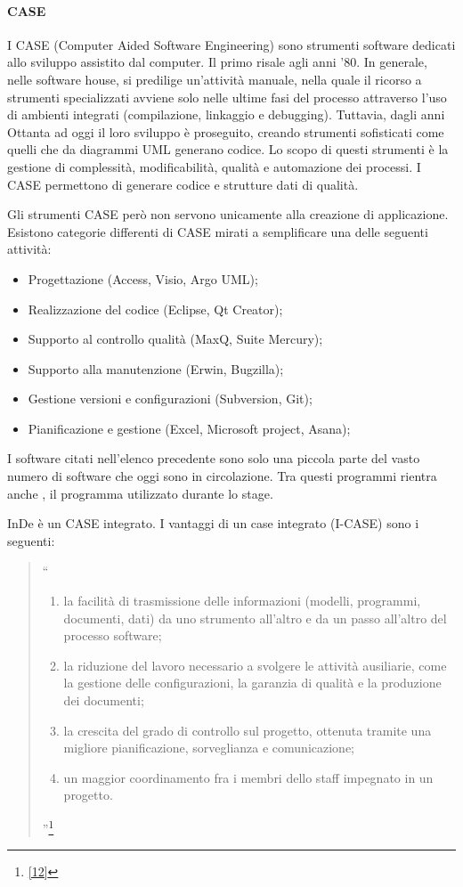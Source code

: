 \paragraph{CASE}\label{CASE}
I CASE (Computer Aided Software Engineering) sono strumenti software dedicati allo sviluppo assistito dal computer. Il primo risale agli anni '80. In generale, nelle software house, si predilige un'attività manuale, nella quale il ricorso a strumenti specializzati avviene solo nelle ultime fasi del processo attraverso l'uso di ambienti integrati (compilazione, linkaggio e debugging).
Tuttavia, dagli anni Ottanta ad oggi il loro sviluppo è proseguito, creando strumenti sofisticati come quelli che da diagrammi UML generano codice.
Lo scopo di questi strumenti è la gestione di complessità, modificabilità, qualità e automazione dei processi. I CASE permettono di generare codice e strutture dati di qualità. 

Gli strumenti CASE però non servono unicamente alla creazione di applicazione. Esistono categorie differenti di CASE mirati a semplificare una delle seguenti attività:
\begin{itemize}
	\item Progettazione (Access, Visio, Argo UML);
	\item Realizzazione del codice (Eclipse, Qt Creator);
	\item Supporto al controllo qualità (MaxQ, Suite Mercury);
	\item Supporto alla manutenzione (Erwin, Bugzilla);
	\item Gestione versioni e configurazioni (Subversion, Git);
	\item Pianificazione e gestione (Excel, Microsoft project, Asana);
\end{itemize}
I software citati nell'elenco precedente sono solo una piccola parte del vasto numero di software che oggi sono in circolazione. Tra questi programmi rientra anche \inde, il programma utilizzato durante lo stage. 

InDe è un CASE integrato. I vantaggi di un case integrato (I-CASE) sono i seguenti:

\begin{quote}
	``	
	\begin{enumerate}
		\item la facilità di trasmissione delle informazioni (modelli, programmi, documenti, dati) da uno strumento all'altro e da un passo all'altro del processo software; 
		\item la riduzione del lavoro necessario a svolgere le attività ausiliarie, come la gestione delle configurazioni, la garanzia di qualità e la produzione dei documenti; 
		\item la crescita del grado di controllo sul progetto, ottenuta tramite una migliore pianificazione, sorveglianza e comunicazione; 
		\item un maggior coordinamento fra i membri dello staff impegnato in un progetto.
	\end{enumerate}
		''\footnote[4]{\hyperref[bib12]{[12]}}
\end{quote}


